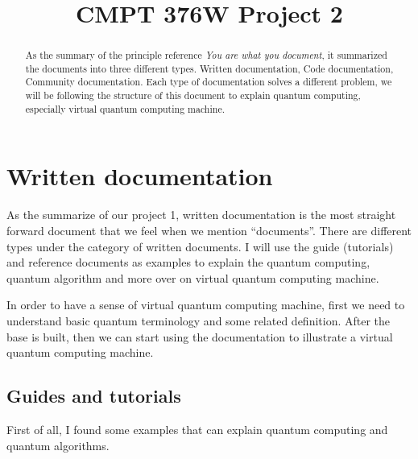 \documentclass{article}
\date{}
\begin{document}
\title{CMPT 376W Project 2\\
}

\author{
\and
{}
\and
{}
\and
{}
\and
{}
}

\maketitle

\begin{abstract}
As the summary of the principle reference \emph{You are what you document}, it summarized the documents into three different types. Written documentation, Code documentation, Community documentation. Each type of documentation solves a different problem, we will be following the structure of this document to explain quantum computing, especially virtual quantum computing machine.

\end{abstract}

\section{Written documentation}
As the summarize of our project 1, written documentation is the most straight forward document that we feel when we mention “documents”. There are different types under the category of written documents. I will use the guide (tutorials) and reference documents as examples to explain the quantum computing, quantum algorithm and more over on virtual quantum computing machine.

In order to have a sense of virtual quantum computing machine, first we need to understand basic quantum terminology and some related definition. After the base is built, then we can start using the documentation to illustrate a virtual quantum computing machine.


\subsection{Guides and tutorials}

First of all, I found some examples that can explain quantum computing and quantum algorithms.
\end{document}
